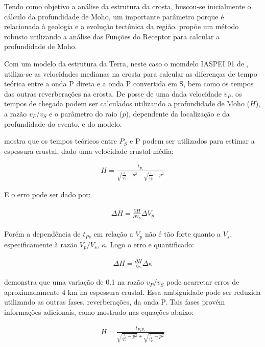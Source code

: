 Tendo como objetivo a análise da estrutura da crosta, buscou-se inicialmente o cálculo da profundidade de Moho, um importante parâmetro porque é relacionada à geologia e a evolução tectônica da região. \cite{Zhu_Kanamori_2000} propõe um método robusto utilizando a análise das Funções do Receptor para calcular a profundidade de Moho.

Com um modelo da estrutura da Terra, neste caso o momdelo IASPEI 91 de \cite{kennet_iaspei_1991}, utiliza-se as velocidades medianas na crosta para calcular as diferenças de tempo teórica entre a onda P direta e a onda P convertida em S, bem como os tempos das outras reverberações na crosta. De posse de uma dada velocidade $v_{P}$, os tempos de chegada podem ser calculados utilizando a profundidade de Moho ($H$), a razão $v_{P}$/$v_{S}$ e o parâmetro do raio ($p$), dependente da localização e da profundidade do evento, e do modelo.

\cite{Zhu_Kanamori_2000} mostra que os tempos teóricos entre $P_{S}$ e P podem ser utilizados para estimar a espessura crustal, dado uma velocidade crustal média:

\begin{eqnarray}
H = {\frac{t_{P_{s}}}{{\sqrt{\frac{1}{V_{s}^{2}} - p^{2}}} - \sqrt{\frac{1}{V_{p}^{2}} - p^{2}}}}
\end{eqnarray}

E o erro pode ser dado por:

\begin{eqnarray}
\Delta H = \frac{\partial H}{\partial V_{p}} \Delta V_{p}
\end{eqnarray}

Porém a dependência de $t_{Ps}$ em relação a $V_{p}$ não é tão forte quanto a $V_{s}$, especificamente à razão $V_{p}/V_{s}$, $\kappa$. Logo o erro e quantificado:

\begin{eqnarray}
\Delta H = \frac{\partial H}{\partial \kappa } \Delta \kappa 
\end{eqnarray}

\cite{Zhu_Kanamori_2000} demonstra que uma variação de 0.1 na razão $v_{P}$/$v_{S}$ pode acarretar erros de aproximadamente 4 km na espessura crustal. Essa ambiguidade pode ser reduzida utilizando as outras fases, reverberações, da onda P. Tais fases provém informações adicionais, como mostrado nas equações abaixo:

\begin{eqnarray}
H = {\frac{t_{P_{p}P_{s}}}{{\sqrt{\frac{1}{V_{s}^{2}} - p^{2}}} + \sqrt{\frac{1}{V_{p}^{2}} - p^{2}}}}
\end{eqnarray}

